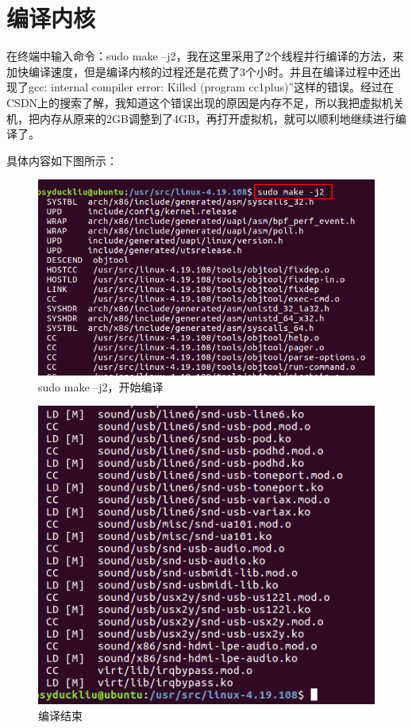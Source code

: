 \documentclass[11pt,a4paper]{article}
\begin{document}
	\section{编译内核}
	在终端中输入命令：sudo make –j2，我在这里采用了2个线程并行编译的方法，来加快编译速度，但是编译内核的过程还是花费了3个小时。并且在编译过程中还出现了gcc: internal compiler error: Killed (program cc1plus)”这样的错误。经过在CSDN上的搜索了解，我知道这个错误出现的原因是内存不足，所以我把虚拟机关机，把内存从原来的2GB调整到了4GB，再打开虚拟机，就可以顺利地继续进行编译了。\par
	具体内容如下图所示：
	\newpage
	\begin{figure}[h]
		\centering
		\includegraphics[width=0.7\linewidth]{Pictures/17_WPS}
		\caption{sudo make –j2，开始编译}
		\label{fig:17wps}
	\end{figure}
	\begin{figure}[h]
		\centering
		\includegraphics[width=0.5\linewidth]{Pictures/18}
		\caption{编译结束}
		\label{fig:18}
	\end{figure}
\end{document}
